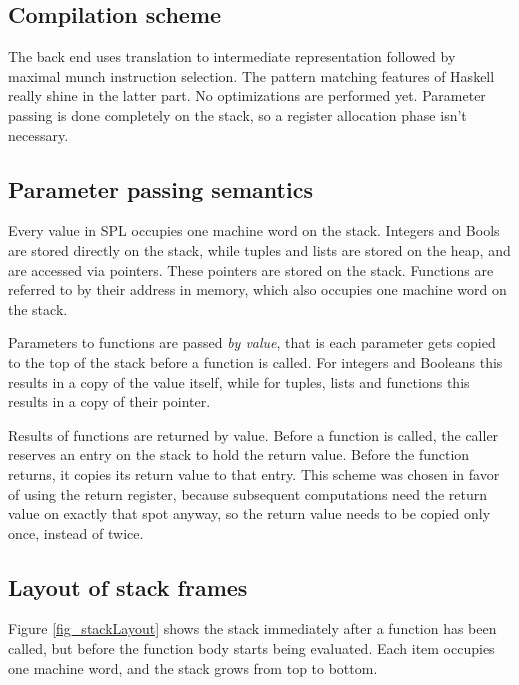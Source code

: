 \documentclass[a4paper]{article}
\begin{document}
\subsection{Compilation scheme}

The back end uses translation to intermediate representation followed by maximal
munch instruction selection.  The pattern matching features of Haskell really
shine in the latter part.  No optimizations are performed yet.  Parameter
passing is done completely on the stack, so a register allocation phase isn't
necessary.

\subsection{Parameter passing semantics}

Every value in SPL occupies one machine word on the stack.  Integers and
Bools are stored directly on the stack, while tuples and lists are stored on
the heap, and are accessed via pointers.  These pointers are stored on the
stack.  Functions are referred to by their address in memory, which also
occupies one machine word on the stack.

Parameters to functions are passed \emph{by value}, that is each parameter
gets copied to the top of the stack before a function is called.  For integers
and Booleans this results in a copy of the value itself, while for tuples, lists
and functions this results in a copy of their pointer.

Results of functions are returned by value.  Before a function is called, the
caller reserves an entry on the stack to hold  the return value.  Before the
function returns, it copies its return value to that entry.  This scheme was
chosen in favor of using the return register, because subsequent
computations need the return value on exactly that spot anyway, so the
return value needs to be copied only once, instead of twice.


\subsection{Layout of stack frames}

Figure \ref{fig_stackLayout} shows the stack immediately after a function has
been called, but before the function body starts being evaluated.  Each item
occupies one machine word, and the stack grows from top to bottom.
\end{document}
